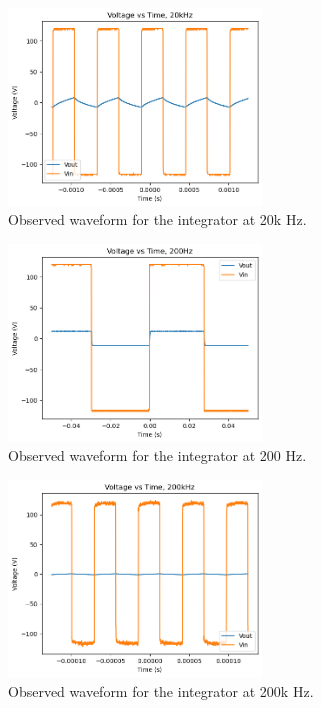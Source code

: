 \documentclass{article}
\begin{document}
\begin{figure}[H]
    \centering
    \includegraphics[width=0.6\textwidth]{./img/Lab2_1b_20k.png}  %
    \caption{Observed waveform for the integrator at 20k Hz.}
\end{figure}

\begin{figure}[H]
    \centering
    \includegraphics[width=0.6\textwidth]{./img/Lab2_1b_200.png}  %
    \caption{Observed waveform for the integrator at 200 Hz.}
\end{figure}

\begin{figure}[H]
    \centering
    \includegraphics[width=0.6\textwidth]{./img/Lab2_1b_200k.png}  %
    \caption{Observed waveform for the integrator at 200k Hz.}
\end{figure}
\end{document}

